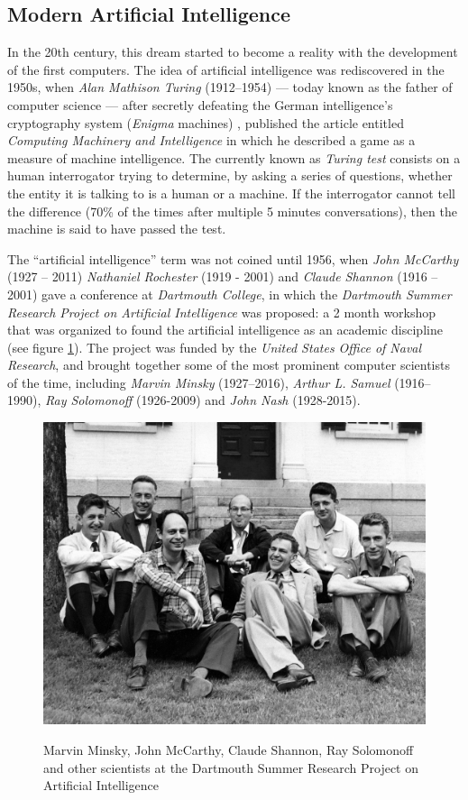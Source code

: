 \subsection{Modern Artificial Intelligence}
In the 20th century, this dream started to become a reality with the development of the first computers. The idea of artificial intelligence was rediscovered in the 1950s, when \textit{Alan Mathison Turing} (1912–1954) — today known as the father of computer science — after secretly defeating the German intelligence's cryptography system (\textit{Enigma} machines) \cite{Hodges:2000}, published the article entitled \textit{Computing Machinery and Intelligence} \cite{turing1950} in which he described a game as a measure of machine intelligence. The currently known as \textit{Turing test} consists on a human interrogator trying to determine, by asking a series of questions, whether the entity it is talking to is a human or a machine. If the interrogator cannot tell the difference (70\% of the times after multiple 5 minutes conversations), then the machine is said to have passed the test.



The ``artificial intelligence'' term was not coined until 1956, when \textit{John McCarthy} (1927 – 2011) \textit{Nathaniel Rochester} (1919 - 2001) and \textit{Claude Shannon} (1916 – 2001) gave a conference at \textit{Dartmouth College}, in which the \textit{Dartmouth Summer Research Project on Artificial Intelligence} was proposed: a 2 month workshop that was organized to found the artificial intelligence as an academic discipline (see figure \ref{fig:dartmouth}). The project was funded by the \textit{United States Office of Naval Research}, and brought together some of the most prominent computer scientists of the time, including \textit{Marvin Minsky} (1927–2016), \textit{Arthur L. Samuel} (1916–1990), \textit{Ray Solomonoff} (1926-2009) and \textit{John Nash} (1928-2015).

\begin{figure}[!htb]
	\centering
	\includegraphics[width=.6\textwidth]{chapter1/images/dartmouth.jpg}
	\label{fig:dartmouth}
	\caption{Marvin Minsky, John McCarthy, Claude Shannon, Ray Solomonoff and other scientists at the Dartmouth Summer Research Project on Artificial Intelligence}
\end{figure}


